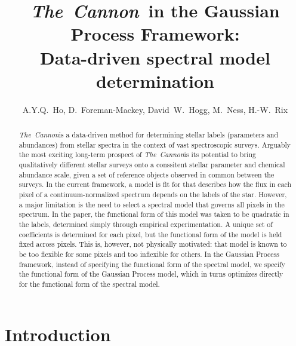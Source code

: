 \documentclass[12pt, preprint]{aastex}
\newcommand{\tc}{\textsl{The~Cannon}}
\begin{document}
\title{\tc\ in the Gaussian Process Framework: \\ Data-driven spectral
model determination}
\author{A.Y.Q.~Ho,
D.~Foreman-Mackey,
David~W.~Hogg, 
M.~Ness,
H.-W.~Rix
}


\begin{abstract}

\tc is a data-driven method for determining stellar labels (parameters and 
abundances) from stellar
spectra in the context of vast spectroscopic surveys. Arguably the most 
exciting long-term prospect of \tc is its potential to bring qualitatively
different stellar surveys onto a conssitent stellar parameter and chemical
abundance scale, given a set of reference objects observed in common between
the surveys. In the current framework, a model is fit for that describes
how the flux in each pixel of a continuum-normalized spectrum depends
on the labels of the star. However, a major limitation is the need to select
a spectral model that governs all pixels in the spectrum. In the paper,
the functional form of this model was taken to be quadratic in the labels, 
determined simply through empirical experimentation. A unique set of 
coefficients is determined for each pixel, but the functional form of the 
model is held fixed across pixels. This is, however, not physically motivated:
that model is known to be too flexible for some pixels and too inflexible 
for others. In the Gaussian Process framework, instead of specifying the
functional form of the spectral model, we specify the functional form of the
Gaussian Process model, which in turns optimizes directly for the functional
form of the spectral model.

\end{abstract}

\keywords{}

\section{Introduction}
\end{document}
